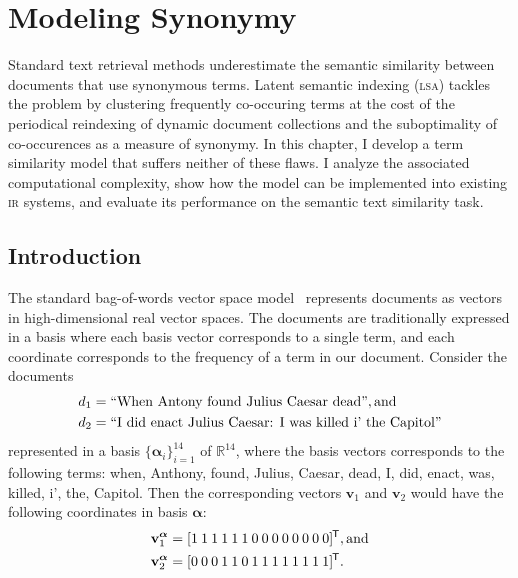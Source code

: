 \documentclass[
  digital, %
  notable, %
  lof,     %
  lot,     %
  nopalatino, color
]{fithesis3}
\def\abbr#1{\textsc{\MakeLowercase{#1}}}
\newcommand*{\tran}{^{\mkern-1.5mu\mathsf{T}}}
\begin{document}

\chapter{Modeling Synonymy}
\label{chap:synonymy}
Standard text retrieval methods underestimate the semantic similarity between
documents that use synonymous terms. Latent semantic indexing (\abbr{LSA}\index{LSA@\abbr{LSA}}) tackles the
problem by clustering frequently co-occuring terms at the cost of the periodical
reindexing of dynamic document collections and the suboptimality of
co-occurences as a measure of synonymy. In this
chapter, I develop a term similarity model that suffers neither of these
flaws. I analyze the associated computational complexity, show how the model
can be implemented into existing \abbr{IR}\index{ir@\abbr {IR}} systems, and
evaluate its performance on the semantic text similarity task.

\section{Introduction}
\label{sec:similarity-introduction}
The standard bag-of-words vector space model~\cite{ir:Salton1975}
represents documents as vectors in high-dimensional real vector spaces.
The documents are traditionally expressed in a basis where each basis vector
corresponds to a single term, and each coordinate corresponds to the frequency
of a term in our document. Consider the documents
\begin{align*}
  d_1 &=\text{``When Antony found Julius Caesar dead''}, \text{and}\index{.d1@$d_1$} \\
  d_2 &=\text{``I did enact Julius Caesar: I was killed i' the Capitol''}\index{.d2@$d_2$}
\end{align*}
represented in a basis $\{\bm\alpha_i\}_{i=1}^{14}$ of
$\mathbb R^{14}$, where the basis vectors corresponds
to the following terms: when, Anthony, found, Julius, Caesar, dead, I, did, enact, was,
killed, i', the, Capitol. Then the corresponding vectors $\mathbf v_1$ and
$\mathbf v_2$ would have the following coordinates in basis $\bm\alpha$:
\begin{align*}
  \mathbf v_1^{\bm\alpha} &= [1\:1\:1\:1\:1\:1\:0\:0\:0\:0\:0\:0\:0\:0]\tran, \text{and} \\
  \mathbf v_2^{\bm\alpha} &= [0\:0\:0\:1\:1\:0\:1\:1\:1\:1\:1\:1\:1\:1]\tran.
\end{align*}
\end{document}
